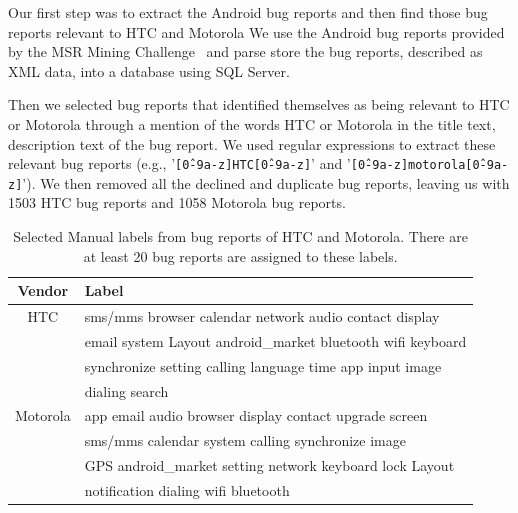 \documentclass[10pt, conference, compsocconf]{IEEEtran}
\begin{document}


Our first step was to extract the Android bug reports and then find
those bug reports relevant to HTC and Motorola
We use the Android bug reports provided by the MSR Mining
Challenge~\cite{MSRChallenge2012}
and parse store the bug reports, described as XML data, into a
database using SQL
Server. 

Then we selected bug reports that identified themselves as being
relevant to HTC or Motorola through a mention of the words HTC or
Motorola in the title text, description text of the bug report.  
We used regular expressions to extract these relevant bug reports (e.g.,
'\texttt{[\^0-9a-z]HTC[\^0-9a-z]}' and
'\texttt{[\^0-9a-z]motorola[\^0-9a-z]}').
We then removed all the declined and duplicate bug reports, leaving us
with 1503 HTC bug reports and 1058 Motorola bug reports.

\begin{table}[!t]
\renewcommand{\arraystretch}{1.3}
\caption{Selected Manual labels from bug reports of HTC and Motorola. There are at least 20 bug reports are assigned to these labels.}
\label{selected1}
\centering
\begin{tabular}{|c||l|}
\hline
Vendor & Label\\
\hline
HTC & sms\//mms browser calendar network audio contact display \\ 
  & email system Layout android\_market bluetooth wifi keyboard\\
  & synchronize setting calling language time app input image\\
  & dialing search\\
\hline
Motorola & app email audio browser display contact upgrade screen\\
    &sms\//mms calendar system calling synchronize image \\
    &GPS android\_market setting network keyboard lock Layout \\
    &notification dialing wifi bluetooth\\
\hline
\end{tabular}
\end{table}
\end{document}
